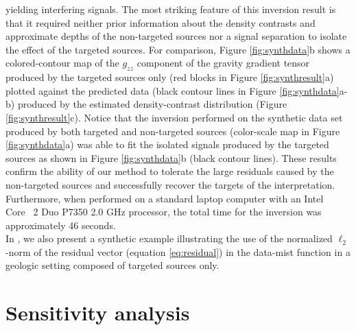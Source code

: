 yielding interfering signals.
The most striking feature of this inversion result is that it required neither
prior information about the density contrasts and approximate depths of the
non-targeted sources nor a signal separation to isolate the effect of the
targeted sources.
For comparison, Figure \ref{fig:synthdata}b shows
a colored-contour map of the $g_{zz}$ component of the gravity gradient tensor
produced by the targeted sources only
(red blocks in Figure \ref{fig:synthresult}a)
plotted against the predicted data (black contour lines in Figure
\ref{fig:synthdata}a-b) produced by the estimated
density-contrast distribution (Figure \ref{fig:synthresult}c).
Notice that the inversion performed on the synthetic data set produced by both
targeted and non-targeted sources (color-scale map in Figure
\ref{fig:synthdata}a) was able to fit the isolated signals
produced by the targeted sources as shown in Figure
\ref{fig:synthdata}b (black contour lines).
These results confirm the ability of our method to
tolerate the large residuals caused by
the non-targeted sources and successfully recover the
targets of the interpretation.
Furthermore, when performed on a standard laptop computer with an
Intel\textregistered ~ Core\texttrademark ~ 2 Duo P7350 2.0 GHz processor, the
total time for the inversion was approximately 46 seconds.
\\ \indent
In \citet{Uieda2012b},
we also present a synthetic example
illustrating the use of
the normalized $\ell_{2}$-norm of the residual vector
(equation \ref{eq:residual})
in the data-mist function in
a geologic setting composed of targeted sources only.

\section{Sensitivity analysis}

